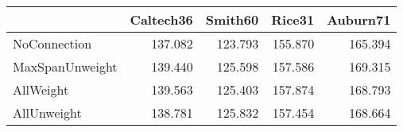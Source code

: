 \begin{tabular}{lrrrr}
\toprule
{} & Caltech36 & Smith60 &  Rice31 & Auburn71 \\
\midrule
NoConnection    &   137.082 & 123.793 & 155.870 &  165.394 \\
MaxSpanUnweight &   139.440 & 125.598 & 157.586 &  169.315 \\
AllWeight       &   139.563 & 125.403 & 157.874 &  168.793 \\
AllUnweight     &   138.781 & 125.832 & 157.454 &  168.664 \\
\bottomrule
\end{tabular}
